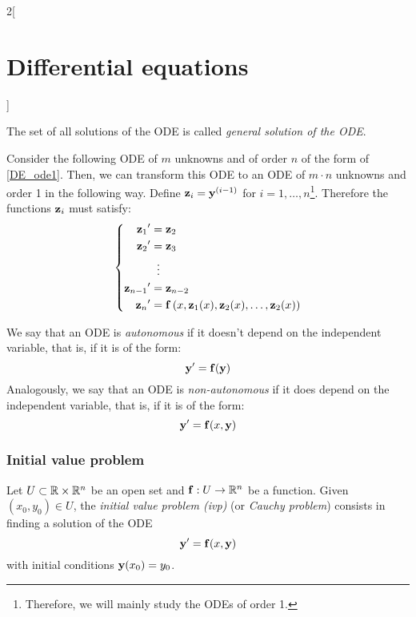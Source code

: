 \documentclass[../../../main.tex]{subfiles}
\begin{document}
\begin{multicols}{2}[\section{Differential equations}]
\begin{definition}
    The set of all solutions of the ODE is called \textit{general solution of the ODE}.
  \end{definition}
  \begin{prop}
    Consider the following ODE of $m$ unknowns and of order $n$ of the form of \eqref{DE_ode1}. Then, we can transform this ODE to an ODE of $m\cdot n$ unknowns and order 1 in the following way. Define $\boldsymbol{\mathrm{z}}_i=\boldsymbol{\mathrm{y}}^{(i-1)}$ for $i=1,\ldots,n$\footnote{Therefore, we will mainly study the ODEs of order 1.}. Therefore the functions $\boldsymbol{\mathrm{z}}_i$ must satisfy:
    \begin{equation*}
      \left\{
      \begin{aligned}
        {\boldsymbol{\mathrm{z}}_1}'     & =\boldsymbol{\mathrm{z}}_2                                                                                            \\
        {\boldsymbol{\mathrm{z}}_2}'     & =\boldsymbol{\mathrm{z}}_3                                                                                            \\
                                    & \;\;\vdots                                                                                                       \\
        {\boldsymbol{\mathrm{z}}_{n-1}}' & =\boldsymbol{\mathrm{z}}_{n-2}                                                                                        \\
        {\boldsymbol{\mathrm{z}}_n}'     & =\boldsymbol{\mathrm{f}}\left(x,\boldsymbol{\mathrm{z}}_1(x),\boldsymbol{\mathrm{z}}_2(x),\ldots,\boldsymbol{\mathrm{z}}_2(x)\right) \\
      \end{aligned}
      \right.
    \end{equation*}
  \end{prop}
  \begin{definition}
    We say that an ODE is \textit{autonomous} if it doesn't depend on the independent variable, that is, if it is of the form: $$\boldsymbol{\mathrm{y}}'=\boldsymbol{\mathrm{f}}(\boldsymbol{\mathrm{y}})$$ Analogously, we say that an ODE is \textit{non-autonomous} if it does depend on the independent variable, that is, if it is of the form: $$\boldsymbol{\mathrm{y}}'=\boldsymbol{\mathrm{f}}(x,\boldsymbol{\mathrm{y}})$$
  \end{definition}
  \subsubsection*{Initial value problem}
  \begin{definition}
    Let $U\subset\mathbb{R}\times\mathbb{R}^n$ be an open set and $\boldsymbol{\mathrm{f}}:U\rightarrow\mathbb{R}^n$ be a function. Given $(x_0,y_0)\in U$, the \textit{initial value problem (ivp)} (or \textit{Cauchy problem}) consists in finding a solution of the ODE $$\boldsymbol{\mathrm{y}}'=\boldsymbol{\mathrm{f}}(x,\boldsymbol{\mathrm{y}})$$ with initial conditions $\boldsymbol{\mathrm{y}}(x_0)=y_0$.
  \end{definition}

\end{multicols}
\end{document}
